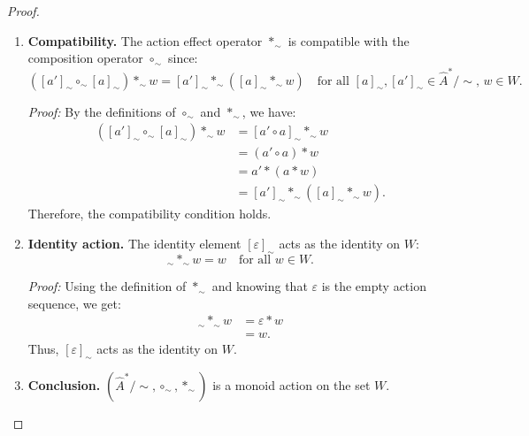 \begin{proof}
	\begin{enumerate}
		\item \textbf{Compatibility.}
		      The action effect operator $\ast_{\sim}$ is compatible with the composition operator $\circ_{\sim}$ since:
		      \begin{equation}
			      ([a']_{\sim} \circ_{\sim} [a]_{\sim}) \ast_{\sim} w = [a']_{\sim} \ast_{\sim} ([a]_{\sim} \ast_{\sim} w) \quad \text{for all } [a]_{\sim}, [a']_{\sim} \in \hat{A}^{\ast}/\sim, \, w \in W.
		      \end{equation}

		      \textit{Proof:} By the definitions of $\circ_{\sim}$ and $\ast_{\sim}$, we have:
		      \begin{align}
			      ([a']_{\sim} \circ_{\sim} [a]_{\sim}) \ast_{\sim} w & = [a' \circ a]_{\sim} \ast_{\sim} w                   \\
			                                                          & = (a' \circ a) \ast w                                 \\
			                                                          & = a' \ast (a \ast w)                                  \\
			                                                          & = [a']_{\sim} \ast_{\sim} ([a]_{\sim} \ast_{\sim} w).
		      \end{align}
		      Therefore, the compatibility condition holds.

		\item \textbf{Identity action.}
		      The identity element $[\varepsilon]_{\sim}$ acts as the identity on $W$:
		      \begin{equation}
			      [\varepsilon]_{\sim} \ast_{\sim} w = w \quad \text{for all } w \in W.
		      \end{equation}

		      \textit{Proof:} Using the definition of $\ast_{\sim}$ and knowing that $\varepsilon$ is the empty action sequence, we get:
		      \begin{align}
			      [\varepsilon]_{\sim} \ast_{\sim} w & = \varepsilon \ast w \\
			                                      & = w.
		      \end{align}
		      Thus, $[\varepsilon]_{\sim}$ acts as the identity on $W$.

		\item \textbf{Conclusion.}
		      $(\hat{A}^{\ast}/\sim, \circ_{\sim}, \ast_{\sim})$ is a monoid action on the set $W$.
	\end{enumerate}
\end{proof}


